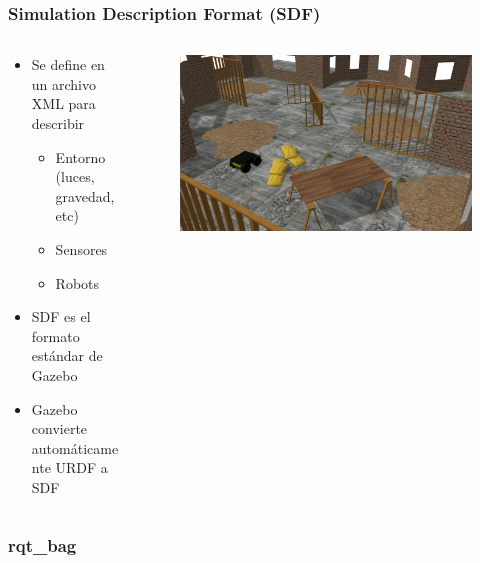 \begin{frame}
    \frametitle{Simulation Description Format (SDF)}
    \footnotesize
   	\begin{columns}
    	\begin{column}{0.5\textwidth}
    		\begin{itemize}
    			\item Se define en un archivo XML para describir
	    		\begin{itemize}
    				\item Entorno (luces, gravedad, etc)
					\item Sensores
					\item Robots
    			\end{itemize}
			\item SDF es el formato estándar de Gazebo
			\item Gazebo convierte automáticamente URDF a SDF 
    		\end{itemize}
    	\end{column}
    	\begin{column}{0.5\textwidth}
    		\begin{figure}[!h]
    			\centering
				\includegraphics[width=\columnwidth]{images/sdf_gazebo.jpg}
    		\end{figure}
    	\end{column}
    \end{columns}
    
\end{frame}


\begin{frame}
    \frametitle{rqt\_bag}
    

    
\end{frame}

